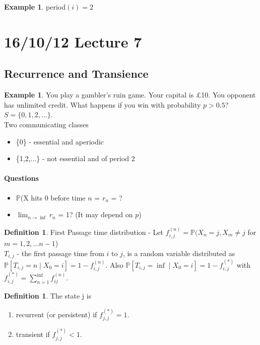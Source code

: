 \documentclass{article}
\theoremstyle{definition}
\newtheorem{defn}[thm]{Definition}
\newtheorem{ex}[thm]{Example}
\newcommand{\PP}{\mathbb{P}}
\begin{document}
\begin{ex}
period$(i) = 2$
\end{ex}

\section{16/10/12 Lecture 7}

\subsection*{Recurrence and Transience}

\begin{ex} You play a gambler's ruin game. Your capital is \pounds 10. You opponent has unlimited credit. What happens if you win with probability $p > 0.5$? $S = \{0, 1, 2, \ldots\}$.\\

Two communicating classes
\begin{itemize}
\item
\{0\} - essential and aperiodic
\item
\{1,2,$\ldots$\} - not essential and of period 2
\end{itemize}
\end{ex}

\paragraph*{Questions}
\begin{itemize}
\item
$\PP$(X hits 0 before time $n$ = $r_n$ = ?
\item
$\lim_{n \rightarrow \inf} r_n$ = 1? (It may depend on $p$)
\end{itemize}

\begin{defn}
First Passage time distribution - Let $f_{i,j}^{(n)} = \PP(X_n = j, X_m \neq j$ for $m = 1, 2, \ldots n-1$)\\

$T_{i,j}$ - the first passage time from $i$ to $j$, is a random variable distributed as $\PP[T_{i,j} = n \mid X_0 = i ] = 1 - f_{i,j}^{(n)}$. Also $\PP[T_{i,j} = \inf \mid X_0 = i] = 1 - f_{i,j}^{(\ast)}$ with $f_{i,j}^{(\ast)} = \sum_{n=1}^{\inf} f_{ij}^{(n)}$. 
\end{defn}

\begin{defn}
The state j is
\begin{enumerate}
\item
recurrent (or persistent) if $f_{j,j}^{(\ast)} = 1$.
\item
transient if $f_{j,j}^{(\ast)} < 1$.
\end{enumerate}
\end{defn}
\end{document}
